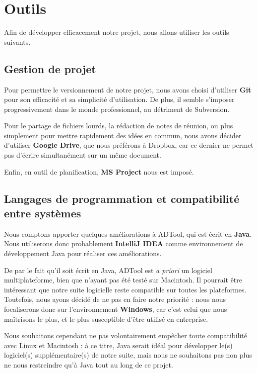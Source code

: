 \section{Outils}
    \label{sec:outils}
    Afin de développer efficacement notre projet, nous allons utiliser les outils suivants.
     
    \subsection{Gestion de projet}
        Pour permettre le versionnement de notre projet, nous avons choisi d'utiliser {\bf Git} pour son efficacité et sa simplicité d'utilisation. De plus, il semble s'imposer progressivement dans le monde professionnel, au détriment de Subversion.
        
        Pour le partage de fichiers lourds, la rédaction de notes de réunion, ou plus simplement pour mettre rapidement des idées en commun, nous avons décider d'utiliser {\bf Google Drive}, que nous préférons à Dropbox, car ce dernier ne permet pas d'écrire simultanément sur un même document.

        Enfin, en outil de planification, {\bf MS Project} nous est imposé.

    \subsection{Langages de programmation et compatibilité entre systèmes}
        Nous comptons apporter quelques améliorations à ADTool, qui est écrit en {\bf Java}. Nous utiliserons donc probablement {\bf IntelliJ IDEA} comme environnement de développement Java pour réaliser ces améliorations.
        
        De par le fait qu'il soit écrit en Java, ADTool est {\itshape a priori} un logiciel multiplateforme, bien que n'ayant pas été testé sur Macintosh. Il pourrait être intéressant que notre suite logicielle reste compatible sur toutes les plateformes. Toutefois, nous ayons décidé de ne pas en faire notre priorité : nous nous focaliserons donc sur l'environnement {\bf Windows}, car c'est celui que nous maîtrisons le plus, et le plus susceptible d'être utilisé en entreprise.
        
        Nous souhaitons cependant ne pas volontairement empêcher toute compatibilité avec Linux et Macintosh : à ce titre, Java serait idéal pour développer le(s) logiciel(s) supplémentaire(s) de notre suite, mais nous ne souhaitons pas non plus ne nous restreindre qu'à Java tout au long de ce projet.
        
